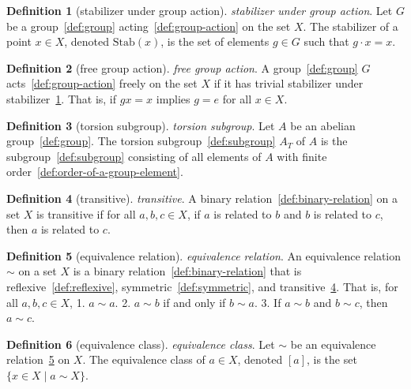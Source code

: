 \documentclass[12pt,a4paper]{article}
\theoremstyle{definition}
\newtheorem{definition}{Definition}
\begin{document}
\begin{definition}[stabilizer under group action]\label{def:stabilizer-under-group-action}
\emph{stabilizer under group action}. Let $G$ be a group~\ref{def:group} acting~\ref{def:group-action} on the set $X$. The stabilizer of a point $x\in X$, denoted $\text{Stab}(x)$, is the set of elements $g\in G$ such that $g\cdot x = x$.
\end{definition}

\begin{definition}[free group action]\label{def:free-group-action}
\emph{free group action}. A group~\ref{def:group} $G$ acts~\ref{def:group-action} freely on the set $X$ if it has trivial stabilizer under stabilizer~\ref{def:stabilizer-under-group-action}. That is, if $gx=x$ implies $g=e$ for all $x\in X$.
\end{definition}

\begin{definition}[torsion subgroup]\label{def:torsion-subgroup}
\emph{torsion subgroup}. Let $A$ be an abelian group~\ref{def:group}. The torsion subgroup~\ref{def:subgroup} $A_T$ of $A$ is the subgroup~\ref{def:subgroup} consisting of all elements of $A$ with finite order~\ref{def:order-of-a-group-element}.
\end{definition}

\begin{definition}[transitive]\label{def:transitive}
\emph{transitive}. A binary relation~\ref{def:binary-relation} on a set $X$ is transitive if for all $a,b,c\in X$, if $a$ is related to $b$ and $b$ is related to $c$, then $a$ is related to $c$.
\end{definition}

\begin{definition}[equivalence relation]\label{def:equivalence-relation}
\emph{equivalence relation}. An equivalence relation $\sim$ on a set $X$ is a binary relation~\ref{def:binary-relation} that is reflexive~\ref{def:reflexive}, symmetric~\ref{def:symmetric}, and transitive~\ref{def:transitive}. That is, for all $a,b,c \in X$,
1. $a\sim a$.
2. $a \sim b$ if and only if $b \sim a$.
3. If $a \sim b$ and $b \sim c$, then $a\sim c$.
\end{definition}

\begin{definition}[equivalence class]\label{def:equivalence-class}
\emph{equivalence class}. Let $\sim$ be an equivalence relation~\ref{def:equivalence-relation} on $X$. The equivalence class of $a \in X$, denoted $[a]$, is the set $\{x \in X \mid a \sim X\}$.
\end{definition}
\end{document}
